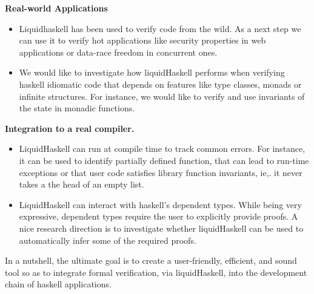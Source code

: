 \textbf{Real-world Applications}
\begin{itemize}

\item Liquidhaskell has been used to verify code from the wild.
As a next step we can use it to verify hot applications
like security properties in web applications
or data-race freedom in concurrent ones.

\item 
  We would like to investigate how liquidHaskell performs when verifying haskell idiomatic 
  code that depends on features like type classes, monads or infinite structures.
  For instance, we would like to verify and use invariants of the state 
  in monadic functions.
\end{itemize}

\textbf{Integration to a real compiler.}
\begin{itemize}
\item LiquidHaskell can run at compile time to track common 
 errors. 
For instance, it can be used to identify partially defined function, 
 that can lead to run-time exceptions or 
 that user code satisfies library function invariants, ie,.
 it never takes a the head of an empty list.
 
\item LiquidHaskell can interact with haskell's dependent types.
  While being very expressive, dependent types require the user to 
  explicitly provide proofs.
  A nice research direction is to investigate 
  whether liquidHaskell can be used to automatically infer
  some of the required proofs.
  \end{itemize}

In a nutshell, the ultimate goal is to create a 
user-friendly, efficient, and sound tool 
so as to integrate formal verification, via liquidHaskell, 
into the development chain of haskell applications.

